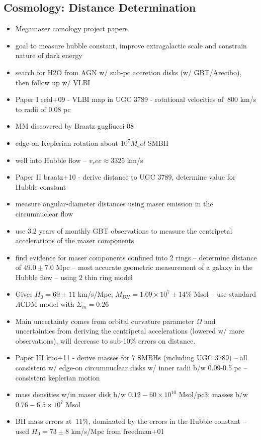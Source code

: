 \subsection{Cosmology: Distance Determination}
\label{sub:h2o_cosmo}

\begin{itemize}
\item Megamaser comology project papers
\item goal to measure hubble constant, improve extragalactic scale and constrain nature of dark energy
\item search for H2O from AGN w/ sub-pc accretion disks (w/ GBT/Arecibo), then follow up w/ VLBI
\item Paper I  reid+09 - VLBI map in UGC 3789 - rotational velocities of $~800$ km/s to radii of 0.08 pc
\item MM discovered by Braatz gugliucci 08
\item edge-on Keplerian rotation about $10^7 M_sol$ SMBH
\item well into Hubble flow -- $v_rec\approx3325$ km/s
\item Paper II braatz+10 - derive distance to UGC 3789, determine value for Hubble constant
\item measure angular-diameter distances using maser emission in the circumnuclear flow
\item use 3.2 years of monthly GBT observations to measure the centripetal accelerations of the maser components
\item find evidence for maser components confined into 2 rings -- determine distance of $49.0\pm7.0$ Mpc -- most accurate geometric measurement of a galaxy in the Hubble flow -- using 2 thin ring model
\item Gives $H_0=69\pm11$ km/s/Mpc; $M_{BH}=1.09\times10^7 \pm 14\% $ Msol -- use standard $\Lambda$CDM model with $\Sigma_m=0.26$
\item Main uncertainty comes from orbital curvature parameter $\Omega$ and uncertainties from deriving the centripetal accelerations (lowered w/ more observations), will decrease to sub-10\% errors on distance.
\item Paper III kuo+11 - derive masses for 7 SMBHs (including UGC 3789) -- all consistent w/ edge-on circumnuclear disks w/ inner radii b/w 0.09-0.5 pc -- consistent keplerian motion
\item mass densities w/in maser disk b/w $0.12-60\times10^{10}$ Msol/pc3; masses b/w $0.76-6.5\times10^7$ Msol
\item BH mass errors at $~11$\%, dominated by the errors in the Hubble constant -- used $H_0=73\pm8$ km/s/Mpc from freedman+01

\end{itemize}
